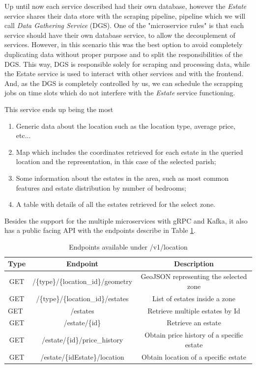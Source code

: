 Up until now each service described had their own database, however the \textit{Estate} service shares their data store with the scraping pipeline, pipeline which we will call \textit{Data Gathering Service} (DGS). One of the "microservice rules" is that each service should have their own database service, to allow the decouplement of services. However, in this scenario this was the best option to avoid completely duplicating data without proper purpose and to split the responsibilities of the DGS. This way, DGS is responsible solely for scraping and processing data, while the Estate service is used to interact with other services and with the frontend. And, as the DGS is completely controlled by us, we can schedule the scrapping jobs on time slots which do not interfere with the \textit{Estate} service functioning.

This service ends up being the most 

\begin{enumerate}
    \item Generic data about the location such as the location type, average price, etc...
    \item Map which includes the coordinates retrieved for each estate in the queried location and the representation, in this case of the selected parish;
    \item Some information about the estates in the area, such as most common features and estate distribution by number of bedrooms;
    \item A table with details of all the estates retrieved for the select zone.
\end{enumerate}

Besides the support for the multiple microservices with gRPC and Kafka, it also has a public facing API with the  endpoints describe in Table \ref{tbl:locationEndpoints}.

\begin{table}[h]
\centering
\caption{Endpoints available under /v1/location}
\begin{tabular}{c|c|c}
\textbf{Type}            & \textbf{Endpoint}                   & \textbf{Description}                      \\ \hline
GET                      & /\{type\}/\{location\_id\}/geometry & GeoJSON representing the selected zone    \\
GET                      & /\{type\}/\{location\_id\}/estates  & List of estates inside a zone             \\
\multicolumn{1}{l|}{GET} & /estates                            & Retrieve multiple estates by Id           \\
GET                      & /estate/\{id\}                      & Retrieve an estate                        \\
GET                      & /estate/\{id\}/price\_history       & Obtain price history of a specific estate \\
GET                      & /estate/\{idEstate\}/location       & Obtain location of a specific estate     
\end{tabular}

\label{tbl:locationEndpoints}
\end{table}

